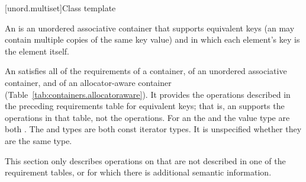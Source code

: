 \documentclass[american,twoside]{book}
\begin{document}
[unord.multiset]{Class template }
%

\pnum
{}%
%
An  is an unordered associative container
that supports equivalent keys (an  may contain
multiple copies of the same key value) and in which each element's key
is the element itself.

\pnum
An  satisfies all of the requirements of a container, of an unordered associative container, and of an allocator-aware container (Table~\ref{tab:containers.allocatoraware}). It provides the operations described in the preceding requirements table for equivalent keys; that is, an  supports the  operations in that table, not the  operations. For an  the  and the value type are both . The  and  types are both const iterator types. It is unspecified whether they are the same type.

\pnum
This section only describes operations on  that
are not described in one of the requirement tables, or for which there
is additional semantic information.
\end{document}

